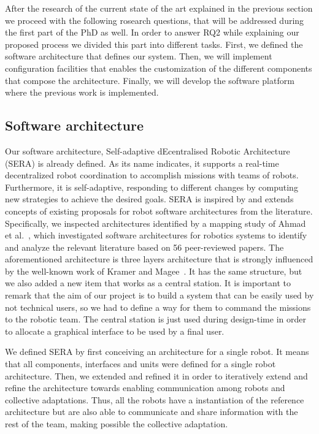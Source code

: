 After the research of the current state of the art explained in the previous section we proceed with the following rosearch questions, that will be addressed during the first part of the PhD as well.
In order to answer RQ2 while explaining our proposed process we divided this part into different tasks.
First, we defined the software architecture that defines our system.
Then, we will implement configuration facilities that enables the customization of the different components that compose the architecture.
Finally, we will develop the software platform where the previous work is implemented.

\subsection{Software architecture}

Our software architecture, Self-adaptive dEcentralised Robotic Architecture (SERA) is already defined.
As its name indicates, it supports a real-time decentralized robot coordination to accomplish missions with teams of robots. 
Furthermore, it is self-adaptive, responding to different changes by computing new strategies to achieve the desired goals.
SERA is inspired by and extends concepts of existing proposals for robot software architectures from the literature. 
Specifically, we inspected architectures identified by a mapping study of Ahmad et al.~\cite{Ahmad201616}, which investigated software architectures for robotics systems to identify and analyze the relevant literature based on 56 peer-reviewed papers.
The aforementioned architecture is three layers architecture that is strongly influenced by the well-known work of Kramer and Magee~\cite{kramer}.
It has the same structure, but we also added a new item that works as a central station.
It is important to remark that the aim of our project is to build a system that can be easily used by not technical users, so we had to define a way for them to command the missions to the robotic team.
The central station is just used during design-time in order to allocate a graphical interface to be used by a final user.

We defined SERA by first conceiving an architecture for a single robot. 
It means that all components, interfaces and units were defined for a single robot architecture. 
Then, we extended and refined it in order to iteratively extend and refine the architecture towards enabling communication among robots and collective adaptations. 
Thus, all the robots have a instantiation of the reference architecture but are also able to communicate and share information with the rest of the team, making possible the collective adaptation. 

